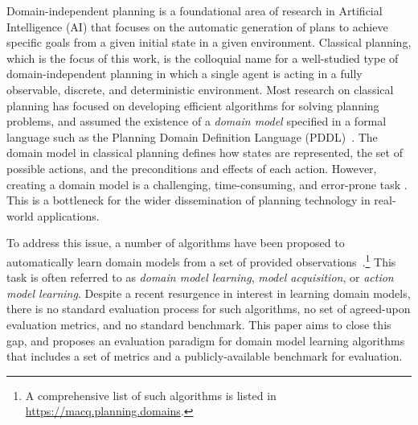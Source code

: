 \documentclass{article}
\theoremstyle{definition}
\theoremstyle{remark}
\newif\ifaddcomments
\newcommand{\roni}[1]{\ifaddcomments{\textcolor{red}{[Roni: #1]}}\fi}
\newcommand{\yarin}[1]{\ifaddcomments{\textcolor{teal}{[Yarin: #1]}}\fi}
\newcommand{\cm}[1]{\ifaddcomments{\textcolor{olive}{[Christian: #1]}}\fi}
\begin{document}
Domain-independent planning is a foundational area of research in Artificial Intelligence (AI) that focuses on the automatic generation of plans to achieve specific goals from a given initial state in a given environment. Classical planning, which is the focus of this work, is the colloquial name for a well-studied type of domain-independent planning in which a single agent is acting in a fully observable, discrete, and deterministic environment. 
Most research on classical planning has focused on developing efficient algorithms for solving planning problems, and assumed the existence of a \emph{domain model} specified in a formal language such as the Planning Domain Definition Language (PDDL)~\citep{haslum2019introduction}. 
The domain model in classical planning defines how states are represented, the set of possible actions, and the preconditions and effects of each action. 
However, creating a domain model is a challenging, time-consuming, and error-prone task \citep{DBLP:conf/kcap/McCluskeyVV17}.
This is a bottleneck for the wider dissemination of planning technology in real-world applications. 

To address this issue, a number of algorithms have been proposed to automatically learn domain models from a set of provided observations~\citep{macq,aineto2019learning,jimenez2012review}.\footnote{A comprehensive list of such algorithms is listed in \url{https://macq.planning.domains}.} 
This task is often referred to as \emph{domain model learning}, \emph{model acquisition}, or \emph{action model learning}. 
Despite a recent resurgence in interest in learning domain models, there is no standard evaluation process for such algorithms, no set of agreed-upon evaluation metrics, and no standard benchmark. 
This paper aims to close this gap, and proposes an evaluation paradigm for domain model learning algorithms that includes a set of metrics and a publicly-available benchmark for evaluation. 
\end{document}
